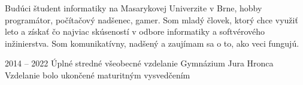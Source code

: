 \documentclass[9pt]{developercv} %
\begin{document}
\vspace{0.5cm}



\begin{minipage}[t]{0.4\textwidth} %
	\vspace{-\baselineskip} %
	
	Budúci študent informatiky na Masarykovej Univerzite v Brne, hobby programátor, počítačový nadšenec, gamer. Som mladý človek, ktorý chce využiť leto a získať čo najviac skúseností v odbore informatiky a softvérového inžinierstva. Som komunikatívny, nadšený a zaujímam sa o to, ako veci fungujú. %
\end{minipage}
\hfill %
\begin{minipage}[t]{0.5\textwidth} %
	\vspace{-\baselineskip} %
	\begin{barchart}{5.5}
	\end{barchart}
\end{minipage}

\begin{center}
\end{center}



\begin{entrylist}
	\entry
		{2014 -- 2022}
		{Úplné stredné všeobecné vzdelanie}
		{Gymnázium Jura Hronca}
		{Vzdelanie bolo ukončené maturitným vysvedčením}
\end{entrylist}

\end{document}

